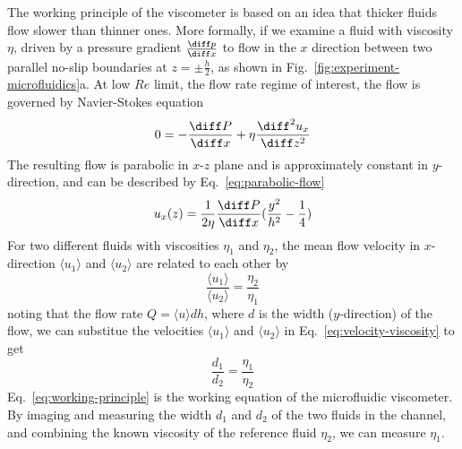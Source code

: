 The working principle of the viscometer is based on an idea that thicker fluids flow slower than thinner ones. More formally, if we examine a fluid with viscosity $\eta$, driven by a pressure gradient $\frac{\diff p}{\diff x}$ to flow in the $x$ direction between two parallel no-slip boundaries at $z=\pm \frac{h}{2}$, as shown in Fig.~\ref{fig:experiment-microfluidics}a. At low $Re$ limit, the flow rate regime of interest, the flow is governed by Navier-Stokes equation
\begin{equation}
	0 = -\frac{\diff P}{\diff x} + \eta \frac{\diff^2 u_x}{\diff z^2}
\end{equation}
The resulting flow is parabolic in $x$-$z$ plane and is approximately constant in $y$-direction, and can be described by Eq.~\ref{eq:parabolic-flow}
\begin{equation}
	\label{eq:parabolic-flow}
	u_x(z) = \frac{1}{2\eta}\frac{\diff P}{\diff x} (\frac{y^2}{h^2}-\frac{1}{4})
\end{equation}
For two different fluids with viscosities $\eta_1$ and $\eta_2$, the mean flow velocity in $x$-direction $\langle u_1 \rangle$ and $\langle u_2 \rangle$ are related to each other by
\begin{equation}
	\label{eq:velocity-viscosity}
	\frac{\langle u_1 \rangle}{\langle u_2 \rangle} = \frac{\eta_2}{\eta_1}
\end{equation}
noting that the flow rate $Q=\langle u \rangle dh$, where $d$ is the width ($y$-direction) of the flow, we can substitue the velocities $\langle u_1 \rangle$ and $\langle u_2 \rangle$ in Eq.~\ref{eq:velocity-viscosity} to get
\begin{equation}
	\label{eq:working-principle}
	\frac{d_1}{d_2} = \frac{\eta_1}{\eta_2}
\end{equation}
Eq.~\ref{eq:working-principle} is the working equation of the microfluidic viscometer. By imaging and measuring the width $d_1$ and $d_2$ of the two fluids in the channel, and combining the known viscosity of the reference fluid $\eta_2$, we can measure $\eta_1$.


